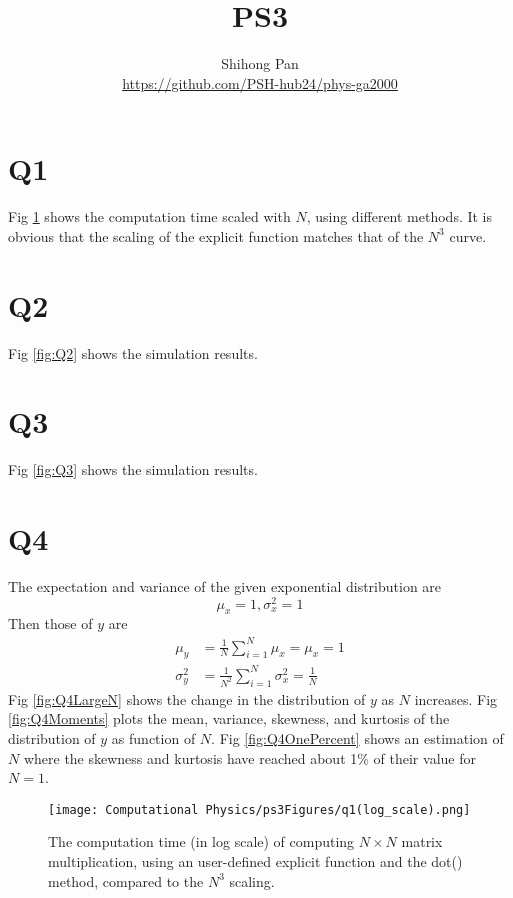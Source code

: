 \documentclass[11pt]{article}
\title{PS3}
\author{Shihong Pan\\ \url{https://github.com/PSH-hub24/phys-ga2000}}
\begin{document}
\maketitle

\section{Q1}
Fig \ref{fig:Q1} shows the computation time scaled with $N$, using different methods. It is obvious that the scaling of the explicit function matches that of the $N^3$ curve.

\section{Q2}
Fig \ref{fig:Q2} shows the simulation results.

\section{Q3}
Fig \ref{fig:Q3} shows the simulation results.

\section{Q4}
The expectation and variance of the given exponential distribution are
\begin{equation}
    \mu_x = 1, \sigma^2_x = 1
\end{equation}
Then those of $y$ are
\begin{equation}
    \begin{aligned}
    \mu_y &= \frac{1}{N}\sum_{i=1}^N\mu_x=\mu_x=1 \\
    \sigma^2_y &= \frac{1}{N^2}\sum_{i=1}^N\sigma^2_x=\frac{1}{N}
    \end{aligned}
\end{equation}
Fig \ref{fig:Q4LargeN} shows the change in the distribution of $y$ as $N$ increases. Fig \ref{fig:Q4Moments} plots the mean, variance, skewness, and kurtosis of the distribution of $y$ as function of $N$. Fig \ref{fig:Q4OnePercent} shows an estimation of $N$ where the skewness and kurtosis have reached about 1\% of their value for $N=1$.


\begin{figure}[b!]
\centering
\texttt{[image: Computational Physics/ps3Figures/q1(log\_scale).png]}
\caption{The computation time (in log scale) of computing $N\times N$ matrix multiplication, using an user-defined explicit function and the dot() method, compared to the $N^3$ scaling.}
  \label{fig:Q1}
\end{figure}
\end{document}
